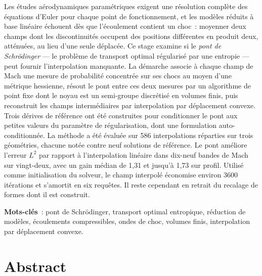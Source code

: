 \documentclass[11pt,a4paper]{article}
\begin{document}
Les études aérodynamiques paramétriques exigent une résolution complète des équations
d'Euler pour chaque point de fonctionnement, et les modèles réduits à base linéaire
échouent dès que l'écoulement contient un choc~: moyenner deux champs dont les
discontinuités occupent des positions différentes en produit deux, atténuées, au lieu
d'une seule déplacée. Ce stage examine si le \emph{pont de Schrödinger} — le problème
de transport optimal régularisé par une entropie — peut fournir l'interpolation
manquante. La démarche associe à chaque champ de Mach une mesure de probabilité
concentrée sur ses chocs au moyen d'une métrique hessienne, résout le pont entre ces
deux mesures par un algorithme de point fixe dont le noyau est un semi-groupe
discrétisé en volumes finis, puis reconstruit les champs intermédiaires par
interpolation par déplacement convexe. Trois dérives de référence ont été construites
pour conditionner le pont aux petites valeurs du paramètre de régularisation, dont une
formulation auto-conditionnée. La méthode a été évaluée sur 586 interpolations réparties
sur trois géométries, chacune notée contre neuf solutions de référence. Le pont améliore
l'erreur $L^2$ par rapport à l'interpolation linéaire dans dix-neuf bandes de Mach sur
vingt-deux, avec un gain médian de 1,31 et jusqu'à 1,73 sur profil. Utilisé comme
initialisation du solveur, le champ interpolé économise environ 3600 itérations et
s'amortit en six requêtes. Il reste cependant en retrait du recalage de formes dont il
est construit.

\vspace{0.4em}
\noindent\textbf{Mots-clés}~: pont de Schrödinger, transport optimal entropique,
réduction de modèles, écoulements compressibles, ondes de choc, volumes finis,
interpolation par déplacement convexe.

\vspace{1.2em}
\section*{Abstract}
\end{document}
